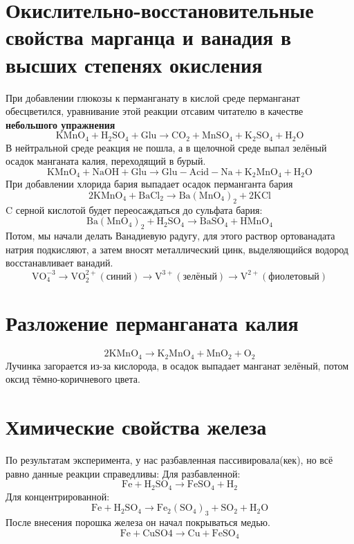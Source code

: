 \documentclass[a4paper,12pt]{article}
\begin{document}
\section{Окислительно-восстановительные свойства марганца и ванадия в высших
степенях окисления}
При добавлении глюкозы к перманганату в кислой среде перманганат обесцветился, уравнивание этой реакции отсавим читателю в качестве \textbf{небольшого упражнения}
\begin{equation} 
\mathrm{KMnO_4 + H_2SO_4 + Glu \longrightarrow CO_2 + MnSO_4 + K_2SO_4 + H_2O }
\end{equation}
В нейтральной среде реакция не пошла, а в щелочной среде выпал зелёный осадок манганата калия, переходящий в бурый.
\begin{equation} 
\mathrm{KMnO_4 + NaOH + Glu \longrightarrow Glu-Acid-Na + K_2MnO_4 + H_2O }
\end{equation}
При добавлении хлорида бария выпадает осадок перманганта бария
\begin{equation} 
\mathrm{2KMnO_4 + BaCl_2 \longrightarrow Ba(MnO_4)_2 + 2KCl }
\end{equation}
C серной кислотой будет переосаждаться до сульфата бария:
\begin{equation} 
\mathrm{Ba(MnO_4)_2  + H_2SO_4 \longrightarrow BaSO_4 + HMnO_4 }
\end{equation}
Потом, мы начали делать Ванадиевую радугу, для этого раствор ортованадата натрия подкисляют, а затем вносят металлический цинк, выделяющийся водород восстанавливает ванадий.
\begin{equation} 
\mathrm{VO_4^{-3} \longrightarrow VO_2^{2+}(синий) \longrightarrow V^{3+}(зелёный)\longrightarrow V^{2+}(фиолетовый)}
\end{equation}

\section{Разложение перманганата калия}
\begin{equation} 
\mathrm{2KMnO_4  \longrightarrow K_2MnO_4 + MnO_2 + O_2}
\end{equation}
Лучинка загорается из-за кислорода, в осадок выпадает манганат зелёный, потом оксид тёмно-коричневого цвета.
\section{Химические свойства железа}
По результатам эксперимента, у нас разбавленная пассивировала(кек), но всё равно данные реакции справедливы:
Для разбавленной:
\begin{equation} 
\mathrm{Fe + H_2SO_4  \longrightarrow FeSO_4 + H_2}
\end{equation}
Для концентрированной:
\begin{equation} 
\mathrm{Fe + H_2SO_4  \longrightarrow Fe_2(SO_4)_3 + SO_2 + H_2O}
\end{equation}
После внесения порошка железа он начал покрываться медью.
\begin{equation} 
\mathrm{Fe + CuSO4  \longrightarrow Cu + FeSO_4}
\end{equation}
\end{document}
